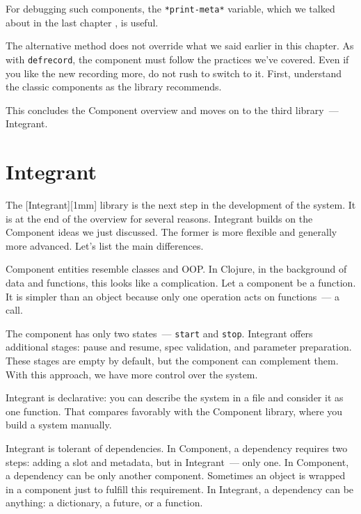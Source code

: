 \fi


\noindent
For debugging such components, the \verb|*print-meta*| variable, which we talked about in the last chapter , is useful.

The alternative method does not override what we said earlier in this chapter. As with \verb|defrecord|, the component must follow the practices we've covered. Even if you like the new recording more, do not rush to switch to it. First, understand the classic components as the library recommends.

This concludes the Component overview and moves on to the third library~--- Integrant.

\section{Integrant}


The [Integrant][1mm] library is the next step in the development of the system. It is at the end of the overview for several reasons. Integrant builds on the Component ideas we just discussed. The former is more flexible and generally more advanced. Let's list the main differences.


Component entities resemble classes and OOP. In Clojure, in the background of data and functions, this looks like a complication. Let a component be a function. It is simpler than an object because only one operation acts on functions~--- a call.

The component has only two states~--- \verb|start| and \verb|stop|. Integrant offers additional stages: pause and resume, spec validation, and parameter preparation. These stages are empty by default, but the component can complement them. With this approach, we have more control over the system.


Integrant is declarative: you can describe the system in a file and consider it as one function. That compares favorably with the Component library, where you build a system manually.

Integrant is tolerant of dependencies. In Component, a dependency requires two steps: adding a slot and metadata, but in Integrant~--- only one. In Component, a dependency can be only another component. Sometimes an object is wrapped in a component just to fulfill this requirement. In Integrant, a dependency can be anything: a dictionary, a future, or a function.

